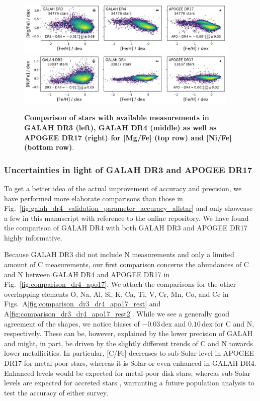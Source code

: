 \documentclass[
  journal=pasa,
  manuscript=research-paper, %
  year=2024,
  volume=37
]{cup-journal}
\newcommand{\dex}{\,\mathrm{dex}}	%
\begin{document}
\begin{figure}[ht]
 \centering
 \includegraphics[width=0.95\textwidth]{figures/comparison_dr4_dr3_apo17_Mg_fe.png}
 \includegraphics[width=0.95\textwidth]{figures/comparison_dr4_dr3_apo17_Ni_fe.png}
 \caption{\textbf{Comparison of stars with available measurements in GALAH DR3 (left), GALAH DR4 (middle) as well as APOGEE DR17 (right) for [Mg/Fe] (top row) and [Ni/Fe] (bottom row)}.}
 \label{fig:comparison_dr4_dr3_apo17}
\end{figure}

\subsubsection{Uncertainties in light of GALAH DR3 and APOGEE DR17}

To get a better idea of the actual improvement of accuracy and precision, we have performed more elaborate comparisons than those in Fig.~\ref{fig:galah_dr4_validation_parameter_accuracy_allstar} and only showcase a few in this manuscript with reference to the online repository. We have found the comparison of GALAH DR4 with both GALAH DR3 and APOGEE DR17 highly informative.

Because GALAH DR3 did not include N measurements and only a limited amount of C measurements, our first comparison concerns the abundances of C and N between GALAH DR4 and APOGEE DR17 in Fig.~\ref{fig:comparison_dr4_apo17}. We attach the comparisons for the other overlapping elements O, Na, Al, Si, K, Ca, Ti, V, Cr, Mn, Co, and Ce in Figs.~A\ref{fig:comparison_dr3_dr4_apo17_rest} and A\ref{fig:comparison_dr3_dr4_apo17_rest2}. While we see a generally good agreement of the shapes, we notice biases of $-0.03\dex$ and $0.10\dex$ for C and N, respectively. These can be, however, explained by the lower precision of GALAH and might, in part, be driven by the slightly different trends of C and N towards lower metallicities. In particular, [C/Fe] decreases to sub-Solar level in APOGEE DR17 for metal-poor stars, whereas it is Solar or even enhanced in GALAH DR4. Enhanced levels would be expected for metal-poor disk stars, whereas sub-Solar levels are expected for accreted stars \citep{Amarsi2019c}, warranting a future population analysis to test the accuracy of either survey.
\end{document}
